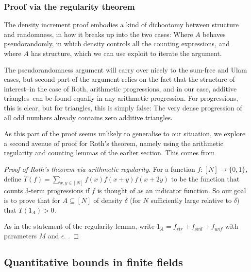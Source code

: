 \documentclass{article}
\theoremstyle{definition}
\theoremstyle{remark}
\numberwithin{equation}{section}
\begin{document}
{\color{red}

\subsubsection{Proof via the regularity theorem}

The density increment proof embodies a kind of dichootomy between
structure and randomness, in how it breaks up into the two cases:
Where $A$ behaves pseudorandomly, in which density controls all the
counting expressions, and where $A$ has structure, which we can use
exploit to iterate the argument.  

The pseudorandomness argument will carry over nicely to the sum-free
and Ulam cases, but second part of the argument relies on the fact
that the structure of interest--in the case of Roth, arithmetic
progressions, and in our case, additive triangles--can be found
equally in any arithmetic progression.  For progressions, this is
clear, but for triangles, this is simply false: The very dense
progression of all odd numbers already contains zero additive
triangles.  

As this part of the proof seems unlikely to generalise to our
situation, we explore a second avenue of proof for Roth's theorem,
namely using the arithmetic regularity and counting lemmas of the
earlier section.  This comes from \cite{higher_fourier_analysis_tao}

\begin{proof}[Proof of Roth's theorem via arithmetic regularity]
  For a function $f : [N] \to \{0,1\}$, define
  $T(f) = \sum_{x,y \in [N]} f(x)f(x+y)f(x+2y)$ to be the function
  that counts 3-term progressions if $f$ is thought of as an indicator
  function.  So our goal is to prove that for $A \subseteq [N]$ of
  density $\delta$ (for $N$ sufficiently large relative to $\delta$)
  that $T(1_A) > 0$.  
  
  As in the statement of the regularity lemma, write
  $1_A = f_{str} + f_{sml} + f_{unf}$ with parameters $M$ and
  $\epsilon$.  .
\end{proof}

}
\subsection{Quantitative bounds in finite fields}
\end{document}
